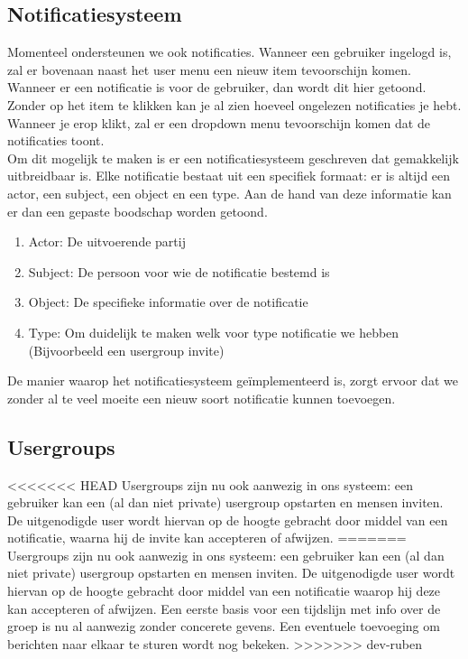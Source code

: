 \documentclass[11pt, a4paper]{article}
\begin{document}
\subsection{Notificatiesysteem}
Momenteel ondersteunen we ook notificaties. Wanneer een gebruiker ingelogd is, zal er bovenaan naast het user menu een nieuw item tevoorschijn komen. Wanneer er een notificatie is voor de gebruiker, dan wordt dit hier getoond. Zonder op het item te klikken kan je al zien hoeveel ongelezen notificaties je hebt. Wanneer je erop klikt, zal er een dropdown menu tevoorschijn komen dat de notificaties toont. \\ 
Om dit mogelijk te maken is er een notificatiesysteem geschreven dat gemakkelijk uitbreidbaar is. Elke notificatie bestaat uit een specifiek formaat: er is altijd een actor, een subject, een object en een type. Aan de hand van deze informatie kan er dan een gepaste boodschap worden getoond. 
\begin{enumerate}
\item Actor: De uitvoerende partij
\item Subject: De persoon voor wie de notificatie bestemd is
\item Object: De specifieke informatie over de notificatie
\item Type: Om duidelijk te maken welk voor type notificatie we hebben (Bijvoorbeeld een usergroup invite)
\end{enumerate}
De manier waarop het notificatiesysteem ge\"implementeerd is, zorgt ervoor dat we zonder al te veel moeite een nieuw soort notificatie kunnen toevoegen.

\subsection{Usergroups}
<<<<<<< HEAD
Usergroups zijn nu ook aanwezig in ons systeem: een gebruiker kan een (al dan niet private) usergroup opstarten en mensen inviten. De uitgenodigde user wordt hiervan op de hoogte gebracht door middel van een notificatie, waarna hij de invite kan accepteren of afwijzen.
=======
Usergroups zijn nu ook aanwezig in ons systeem: een gebruiker kan een (al dan niet private) usergroup opstarten en mensen inviten. De uitgenodigde user wordt hiervan op de hoogte gebracht door middel van een notificatie waarop hij deze kan accepteren of afwijzen. Een eerste basis voor een tijdslijn met info over de groep is nu al aanwezig zonder concerete gevens. Een eventuele toevoeging om berichten naar elkaar te sturen wordt nog bekeken.
>>>>>>> dev-ruben
\end{document}
